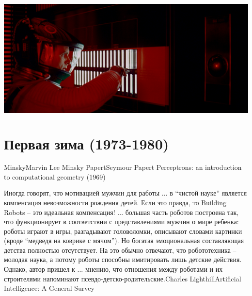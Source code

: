 \documentclass[24pt,pdf,hyperref={unicode}]{beamer}
\begin{document}
\begin{frame}
\includegraphics[width=\textwidth]{Portraits/HAL9000.jpg}
\end{frame}


\section{Первая зима (1973-1980)}

\begin{frame}


\doublebio
{Minsky}{Marvin Lee Minsky}
{Papert}{Seymour Papert}
{Perceptrons: an introduction to computational geometry (1969)}

\end{frame}


\begin{frame}
\end{frame}

\begin{frame}
\citate
{\small
Иногда говорят, что мотивацией мужчин для работы ... в ``чистой науке'' является компенсация невозможности рождения детей. Если это правда, то Building Robots -- это идеальная компенсация! ... большая часть роботов построена так, что функционирует в соответствии с представлениями мужчин о мире ребенка: роботы играют в игры, разгадывают головоломки, описывают словами картинки (вроде ``медведя на коврике с мячом''). Но богатая эмоциональная составляющая детства полностью отсутствует. На это обычно отвечают, что робототехника -- молодая наука, а потому роботы способны имитировать лишь детские действия. Однако, автор пришел к ... мнению, что отношения между роботами и их строителями напоминают псевдо-детско-родительские.}{Charles Lighthill}{Artificial Intelligence: A General Survey}
\end{frame}

\begin{frame}
\end{frame}
\end{document}
